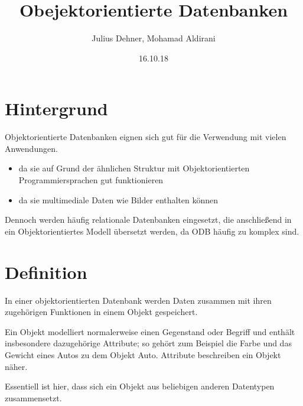 \documentclass{article}
\title{Obejektorientierte Datenbanken}
\author{Julius Dehner, Mohamad Aldirani}
\date{16.10.18}
\begin{document}
\maketitle



\section{Hintergrund}

Objektorientierte Datenbanken eignen sich gut für die Verwendung mit vielen Anwendungen.
\begin{itemize}
\item da sie auf Grund der ähnlichen Struktur mit Objektorientierten Programmiersprachen gut funktionieren
\item da sie multimediale Daten wie Bilder enthalten können
\end{itemize}
Dennoch werden häufig relationale Datenbanken eingesetzt, die anschließend in ein Objektorientiertes Modell übersetzt werden, da ODB häufig zu komplex sind.

\section{Definition}
In einer objektorientierten Datenbank werden Daten zusammen mit ihren zugehörigen Funktionen in einem Objekt gespeichert.

Ein Objekt modelliert normalerweise einen Gegenstand oder Begriff und enthält insbesondere dazugehörige Attribute; so gehört zum Beispiel die Farbe und das Gewicht eines Autos zu dem Objekt Auto. Attribute beschreiben ein Objekt näher. 

Essentiell ist hier, dass sich ein Objekt aus beliebigen anderen Datentypen zusammensetzt.
\end{document}

